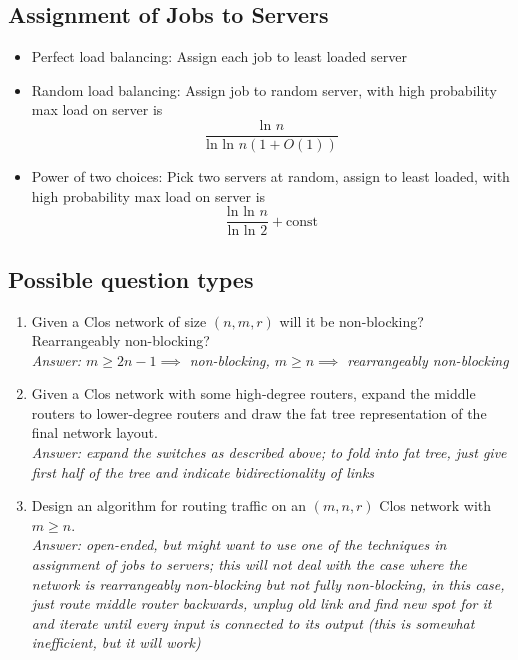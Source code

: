 \documentclass{article}
\begin{document}
\subsection{Assignment of Jobs to Servers}

\begin{itemize}
\item Perfect load balancing: Assign each job to least loaded server
\item Random load balancing: Assign job to random server, with high probability max load on server is
$$\frac{\text{ln } n}{\text{ln ln } n(1 + O(1))} $$
\item Power of two choices: Pick two servers at random, assign to least loaded, with high probability max load on server is
$$ \frac{\text{ln ln } n}{\text{ln ln } 2} + \text{const} $$
\end{itemize}

\subsection{Possible question types}

\begin{enumerate}
\item Given a Clos network of size $(n, m, r)$ will it be non-blocking? Rearrangeably non-blocking? \\
\textit{Answer: $m \geq 2n - 1 \implies$ non-blocking, $m \geq n \implies$ rearrangeably non-blocking}
\item Given a Clos network with some high-degree routers, expand the middle routers to lower-degree routers and draw the fat tree representation of the final network layout. \\
\textit{Answer: expand the switches as described above; to fold into fat tree, just give first half of the tree and indicate bidirectionality of links}
\item Design an algorithm for routing traffic on an $(m, n, r)$ Clos network with $m \geq n$. \\
\textit{Answer: open-ended, but might want to use one of the techniques in assignment of jobs to servers; this will not deal with the case where the network is rearrangeably non-blocking but not fully non-blocking, in this case, just route middle router backwards, unplug old link and find new spot for it and iterate until every input is connected to its output (this is somewhat inefficient, but it will work)}
\end{enumerate}
\end{document}
